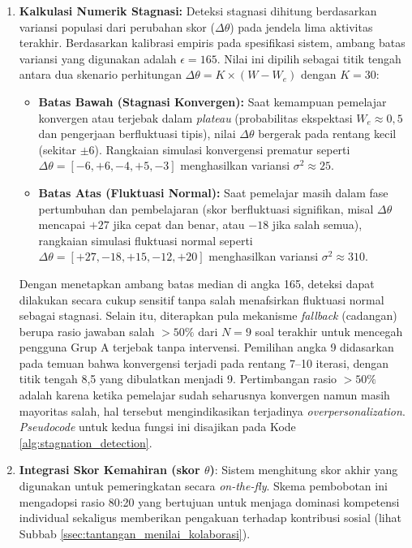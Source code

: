 \begin{enumerate}
    \item \textbf{Kalkulasi Numerik Stagnasi:} Deteksi stagnasi dihitung berdasarkan variansi populasi dari perubahan skor ($\Delta\theta$) pada jendela lima aktivitas terakhir. Berdasarkan kalibrasi empiris pada spesifikasi sistem, ambang batas variansi yang digunakan adalah $\epsilon = 165$. Nilai ini dipilih sebagai titik tengah antara dua skenario perhitungan $\Delta\theta = K \times (W - W_e)$ dengan $K=30$:
    \begin{itemize}
        \item \textbf{Batas Bawah (Stagnasi Konvergen):} Saat kemampuan pemelajar konvergen atau terjebak dalam \textit{plateau} (probabilitas ekspektasi $W_e \approx 0,5$ dan pengerjaan berfluktuasi tipis), nilai $\Delta\theta$ bergerak pada rentang kecil (sekitar $\pm 6$). Rangkaian simulasi konvergensi prematur seperti $\Delta\theta = [-6, +6, -4, +5, -3]$ menghasilkan variansi $\sigma^2 \approx 25$.
        \item \textbf{Batas Atas (Fluktuasi Normal):} Saat pemelajar masih dalam fase pertumbuhan dan pembelajaran (skor berfluktuasi signifikan, misal $\Delta\theta$ mencapai $+27$ jika cepat dan benar, atau $-18$ jika salah semua), rangkaian simulasi fluktuasi normal seperti $\Delta\theta = [+27, -18, +15, -12, +20]$ menghasilkan variansi $\sigma^2 \approx 310$.\\
    \end{itemize}
    Dengan menetapkan ambang batas median di angka 165, deteksi dapat dilakukan secara cukup sensitif tanpa salah menafsirkan fluktuasi normal sebagai stagnasi. Selain itu, diterapkan pula mekanisme \textit{fallback} (cadangan) berupa rasio jawaban salah $>50\%$ dari $N=9$ soal terakhir untuk mencegah pengguna Grup A terjebak tanpa intervensi. Pemilihan angka 9 didasarkan pada temuan \textcite{Vesin2022} bahwa konvergensi terjadi pada rentang 7--10 iterasi, dengan titik tengah 8,5 yang dibulatkan menjadi 9. Pertimbangan rasio $>50\%$ adalah karena ketika pemelajar sudah seharusnya konvergen namun masih mayoritas salah, hal tersebut mengindikasikan terjadinya \textit{overpersonalization}. \textit{Pseudocode} untuk kedua fungsi ini disajikan pada Kode \ref{alg:stagnation_detection}.



    \item \textbf{Integrasi Skor Kemahiran (skor $\theta$)}: Sistem menghitung skor akhir yang digunakan untuk pemeringkatan secara \textit{on-the-fly}. Skema pembobotan ini mengadopsi rasio 80:20 \autocite{Demetroulis2024} yang bertujuan untuk menjaga dominasi kompetensi individual sekaligus memberikan pengakuan terhadap kontribusi sosial (lihat Subbab \ref{ssec:tantangan_menilai_kolaborasi}).
\end{enumerate}

